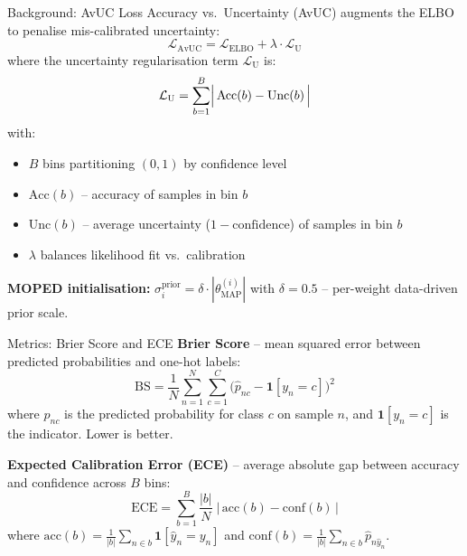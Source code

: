\documentclass{beamer}
\begin{document}
\begin{frame}{Background: AvUC Loss}
Accuracy vs.\ Uncertainty (AvUC) augments the ELBO to penalise mis-calibrated uncertainty:
\[
\mathcal{L}_{\text{AvUC}} = \mathcal{L}_{\text{ELBO}} + \lambda \cdot \mathcal{L}_{\text{U}}
\]
where the uncertainty regularisation term $\mathcal{L}_{\text{U}}$ is:
\[
\mathcal{L}_{\text{U}} = \sum_{b=1}^{B} \Bigl|\, \text{Acc}(b) - \text{Unc}(b) \,\Bigr|
\]
with:
\begin{itemize}
    \item $B$ bins partitioning $(0,1)$ by confidence level
    \item $\text{Acc}(b)$ -- accuracy of samples in bin $b$
    \item $\text{Unc}(b)$ -- average uncertainty ($1-\text{confidence}$) of samples in bin $b$
    \item $\lambda$ balances likelihood fit vs.\ calibration
\end{itemize}
\textbf{MOPED initialisation:} $\sigma_i^{\text{prior}} = \delta \cdot |\theta_{\text{MAP}}^{(i)}|$ with $\delta=0.5$ -- per-weight data-driven prior scale.
\end{frame}

\begin{frame}{Metrics: Brier Score and ECE}
\textbf{Brier Score} -- mean squared error between predicted probabilities and one-hot labels:
\[
\text{BS} = \frac{1}{N}\sum_{n=1}^{N}\sum_{c=1}^{C}\bigl(\hat{p}_{nc} - \mathbf{1}[y_n=c]\bigr)^2
\]
where $\hat{p}_{nc}$ is the predicted probability for class $c$ on sample $n$, and $\mathbf{1}[y_n=c]$ is the indicator.
Lower is better.

\vspace{0.3cm}
\textbf{Expected Calibration Error (ECE)} -- average absolute gap between accuracy and confidence across $B$ bins:
\[
\text{ECE} = \sum_{b=1}^{B} \frac{|b|}{N}\; \bigl|\,\text{acc}(b) - \text{conf}(b)\,\bigr|
\]
where $\text{acc}(b) = \frac{1}{|b|}\sum_{n\in b}\mathbf{1}[\hat{y}_n=y_n]$ and $\text{conf}(b) = \frac{1}{|b|}\sum_{n\in b}\hat{p}_{n\hat{y}_n}$.
\end{frame}
\end{document}
